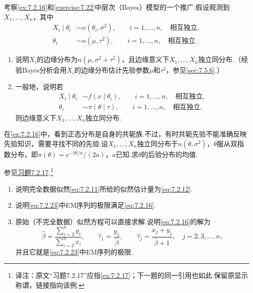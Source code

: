\begin{exercise}\label{exercise:7.25}
考察\autoref{ex:7.2.16}和\autoref{exercise:7.22}中层次（Bayes）模型的一个推广.假设观测到$X_1,\ldots,X_n$，其中
\begin{align*}
X_i\mid\theta_i&\sim n(\theta_i,\sigma^2),\qquad i=1,\ldots,n,\quad\text{相互独立},\\
\theta_i&\sim n(\mu,\tau^2),\qquad i=1,\ldots,n,\quad\text{相互独立}.
\end{align*}
\begin{enumerate}[label=(\alph*)]
\item 说明$X_i$的边缘分布为$n(\mu,\sigma^2+\tau^2)$，且边缘意义下$X_1,\ldots,X_n$独立同分布.（经验Bayes分析会用$X_i$的边缘分布估计先验参数$\mu$和$\tau^2$，参见\autoref{sec:7.5.6}.）
\item 一般地，说明若
\begin{align*}
X_i\mid\theta_i&\sim f(x\mid\theta_i),\qquad i=1,\ldots,n,\quad\text{相互独立},\\
\theta_i&\sim\pi(\theta\mid\tau),\qquad i=1,\ldots,n,\quad\text{相互独立},
\end{align*}
则边缘意义下$X_1,\ldots,X_n$独立同分布.
\end{enumerate}
\end{exercise}
\begin{exercise}\label{exercise:7.26}
在\autoref{ex:7.2.16}中，看到正态分布是自身的共轭族.不过，有时共轭先验不能准确反映先验知识，需要寻找不同的先验.设$X_1,\ldots,X_n$独立同分布于$n(\theta,\sigma^2)$，$\theta$服从双指数分布，即$\pi(\theta)=e^{-|\theta|/a}/(2a)$，$a$已知.求$\theta$的后验分布的均值.
\end{exercise}
\begin{exercise}\label{exercise:7.27}
参见\hyperref[ex:7.2.17]{习题7.2.17}.\footnote{译注：原文“习题7.2.17”应指\autoref{ex:7.2.17}；下一题的同一引用也如此.保留原显示称谓，链接指向该例.}
\begin{enumerate}[label=(\alph*)]
\item 说明完全数据似然\eqref{eq:7.2.11}所给的似然估计量为\eqref{eq:7.2.12}.
\item 说明\eqref{eq:7.2.23}中EM序列的极限满足\eqref{eq:7.2.16}.
\item 原始（不完全数据）似然方程可以直接求解.说明\eqref{eq:7.2.16}的解为
$$\widehat\beta=\frac{\sum_{i=2}^ny_i}{\sum_{i=2}^nx_i},\qquad\widehat\tau_1=\frac{y_1}{\widehat\beta},\qquad\widehat\tau_j=\frac{x_j+y_j}{\widehat\beta+1},\quad j=2,3,\ldots,n,$$
并且它就是\eqref{eq:7.2.23}中EM序列的极限.
\end{enumerate}
\end{exercise}
